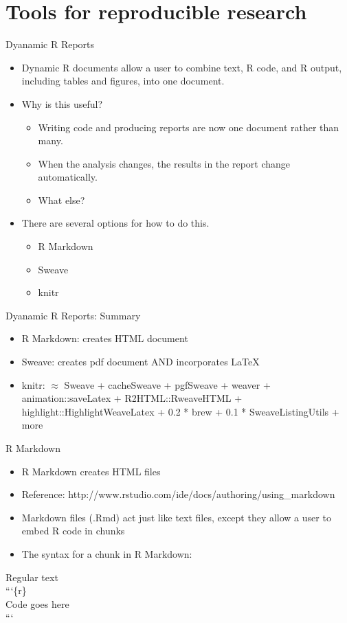 \section{Tools for reproducible research}
\begin{frame}{Dyanamic R Reports}
\begin{itemize}
\item Dynamic R documents allow a user to combine text, R code, and R output, including tables and figures, into one document.
\item Why is this useful? 
\begin{itemize}
\item Writing code and producing reports are now one document rather than many.
\item When the analysis changes, the results in the report change automatically.  
\item What else?
\end{itemize}
\item There are several options for how to do this.  
\begin{itemize}
\item R Markdown
\item Sweave
\item knitr
\end{itemize}
\end{itemize}
\end{frame}


\begin{frame}{Dyanamic R Reports: Summary}
\begin{itemize}
\item R Markdown: creates HTML document
\item Sweave: creates pdf document AND incorporates LaTeX
\item knitr: $\approx$ Sweave + cacheSweave + pgfSweave + weaver + animation::saveLatex + R2HTML::RweaveHTML + highlight::HighlightWeaveLatex + 0.2 * brew + 0.1 * SweaveListingUtils + more
\end{itemize}
\end{frame}

\begin{frame}{R Markdown}
\begin{itemize}
\item R Markdown creates HTML files  
\item Reference: http://www.rstudio.com/ide/docs/authoring/using\_markdown
\item Markdown files (.Rmd) act just like text files, except they allow a user to embed R code in chunks
\item The syntax for a chunk in R Markdown:
\end{itemize}
Regular text \\
```\{r\}\\
Code goes here\\
```\\
\end{frame}

